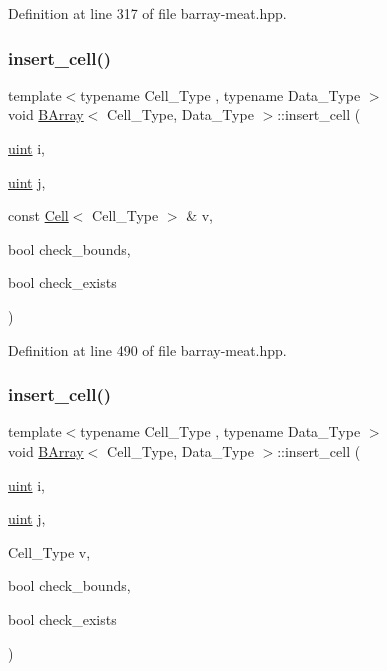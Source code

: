 Definition at line 317 of file barray-\/meat.\+hpp.

\mbox{\label{class_b_array_a25f32967d46f1df46ee4b0eea593a66d}} 
\subsubsection{\texorpdfstring{insert\+\_\+cell()}{insert\_cell()}\hspace{0.1cm}{\footnotesize\ttfamily [1/2]}}
{\footnotesize\ttfamily template$<$typename Cell\+\_\+\+Type , typename Data\+\_\+\+Type $>$ \\
void \hyperlink{class_b_array}{B\+Array}$<$ Cell\+\_\+\+Type, Data\+\_\+\+Type $>$\+::insert\+\_\+cell (\begin{DoxyParamCaption}\item[{\hyperlink{typedefs_8hpp_a91ad9478d81a7aaf2593e8d9c3d06a14}{uint}}]{i,  }\item[{\hyperlink{typedefs_8hpp_a91ad9478d81a7aaf2593e8d9c3d06a14}{uint}}]{j,  }\item[{const \hyperlink{class_cell}{Cell}$<$ Cell\+\_\+\+Type $>$ \&}]{v,  }\item[{bool}]{check\+\_\+bounds,  }\item[{bool}]{check\+\_\+exists }\end{DoxyParamCaption})\hspace{0.3cm}{\ttfamily [inline]}}



Definition at line 490 of file barray-\/meat.\+hpp.

\mbox{\label{class_b_array_a4790d707fcf6a5b552816258922ca25b}} 
\subsubsection{\texorpdfstring{insert\+\_\+cell()}{insert\_cell()}\hspace{0.1cm}{\footnotesize\ttfamily [2/2]}}
{\footnotesize\ttfamily template$<$typename Cell\+\_\+\+Type , typename Data\+\_\+\+Type $>$ \\
void \hyperlink{class_b_array}{B\+Array}$<$ Cell\+\_\+\+Type, Data\+\_\+\+Type $>$\+::insert\+\_\+cell (\begin{DoxyParamCaption}\item[{\hyperlink{typedefs_8hpp_a91ad9478d81a7aaf2593e8d9c3d06a14}{uint}}]{i,  }\item[{\hyperlink{typedefs_8hpp_a91ad9478d81a7aaf2593e8d9c3d06a14}{uint}}]{j,  }\item[{Cell\+\_\+\+Type}]{v,  }\item[{bool}]{check\+\_\+bounds,  }\item[{bool}]{check\+\_\+exists }\end{DoxyParamCaption})\hspace{0.3cm}{\ttfamily [inline]}}



